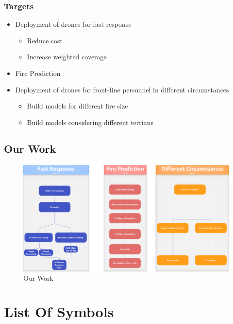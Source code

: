 \documentclass{mcmthesis}
\begin{document}
\subsubsection{Targets}


\begin{itemize}
  \item
    Deployment of drones for fast response
  
    \begin{itemize}
    \item
      Reduce cost
    \item
      Increase weighted coverage
    \end{itemize}
  \item
    Fire Prediction
  \item
    Deployment of drones for front-line personnel in different
    circumstances
  
    \begin{itemize}
    \item
      Build models for different fire size
    \item
      Build models considering different terrians
    \end{itemize}
  \end{itemize}

\subsection{Our Work}
\begin{figure}[h!]
  \includegraphics[width=\linewidth]{flowchart1.png}
  \caption{Our Work}
\end{figure}

\section{List Of Symbols}
  
\end{document}

